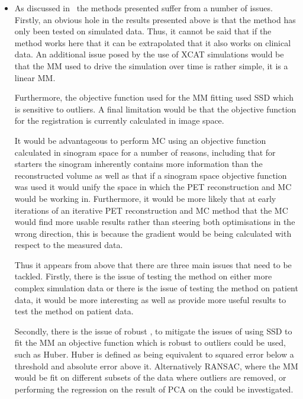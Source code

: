         \begin{itemize}
            \item As discussed in~ the methods presented suffer from a number of issues. Firstly, an obvious hole in the results presented above is that the method has only been tested on simulated data. Thus, it cannot be said that if the method works here that it can be extrapolated that it also works on clinical data. An additional issue posed by the use of \gls{XCAT} simulations would be that the \gls{MM} used to drive the simulation over time is rather simple, it is a linear \gls{MM}.
            
            Furthermore, the objective function used for the \gls{MM} fitting used \gls{SSD} which is sensitive to outliers. A final limitation would be that the objective function for the registration is currently calculated in image space.
            
            It would be advantageous to perform \gls{MC} using an objective function calculated in sinogram space for a number of reasons, including that for starters the sinogram inherently contains more information than the reconstructed volume as well as that if a sinogram space objective function was used it would unify the space in which the \gls{PET} reconstruction and \gls{MC} would be working in. Furthermore, it would be more likely that at early iterations of an iterative \gls{PET} reconstruction and \gls{MC} method that the \gls{MC} would find more usable results rather than steering both optimisations in the wrong direction, this is because the gradient would be being calculated with respect to the measured data.
            
            Thus it appears from above that there are three main issues that need to be tackled. Firstly, there is the issue of testing the method on either more complex simulation data or there is the issue of testing the method on patient data, it would be more interesting as well as provide more useful results to test the method on patient data.
            
            Secondly, there is the issue of robust , to mitigate the issues of using \gls{SSD} to fit the \gls{MM} an objective function which is robust to outliers could be used, such as Huber. Huber is defined as being equivalent to squared error below a threshold and absolute error above it. Alternatively \gls{RANSAC}, where the \gls{MM} would be fit on different subsets of the data where outliers are removed, or performing the regression on the result of \gls{PCA} on the  could be investigated.
            

\end{itemize}
